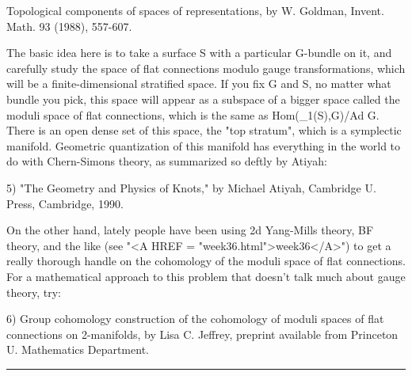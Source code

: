 Topological components of spaces of representations, by W. Goldman, Invent.
Math. 93 (1988), 557-607.


The basic idea here is to take a surface S with a particular G-bundle on
it, and carefully study the space of flat connections modulo gauge
transformations, which will be a finite-dimensional stratified space.
If you fix G and S, no matter what bundle you pick, this space will
appear as a subspace of a bigger space called the moduli space of flat
connections, which is the same as Hom(\pi _1(S),G)/Ad G.  There is an open
dense set of this space, the "top stratum", which is a symplectic
manifold.  Geometric quantization of this manifold has everything in the
world to do with Chern-Simons theory, as summarized so deftly by Atiyah:

5) "The Geometry and Physics of Knots," by Michael Atiyah, Cambridge U.
Press, Cambridge, 1990. 

On the other hand, lately people have been using 2d Yang-Mills theory, BF
theory, and the like (see "<A HREF = "week36.html">week36</A>") to get a really thorough handle on
the cohomology of the moduli space of flat connections.  For a
mathematical approach to this problem that doesn't talk much about gauge
theory, try:

6) Group cohomology construction of the cohomology of moduli spaces of
flat connections on 2-manifolds, by Lisa C. Jeffrey, preprint available
from Princeton U. Mathematics Department.  
\par\noindent\rule{\textwidth}{0.4pt}

